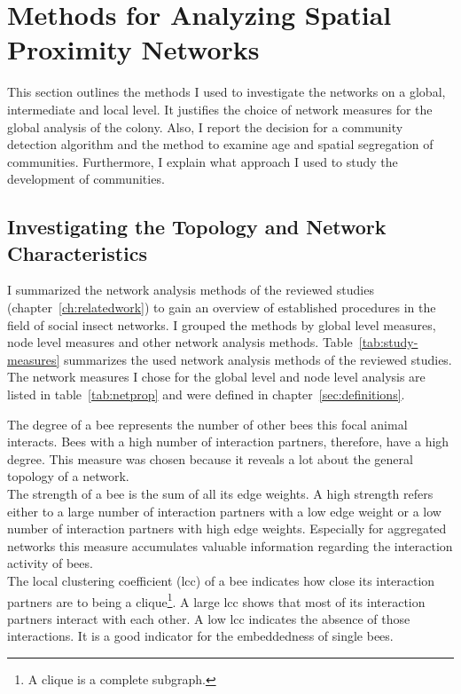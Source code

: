 \section{Methods for Analyzing Spatial Proximity Networks}
This section outlines the methods I used to investigate the networks on a global, intermediate and local level.
It justifies the choice of network measures for the global analysis of the colony.
Also, I report the decision for a community detection algorithm and the method to examine age and spatial segregation of communities.
Furthermore, I explain what approach I used to study the development of communities.

\subsection{Investigating the Topology and Network Characteristics}
\label{subsec:APmeasures}
I summarized the network analysis methods of the reviewed studies (chapter~\ref{ch:relatedwork}) to gain an overview of established procedures in the field of social insect networks. I grouped the methods by global level measures, node level measures and other network analysis methods.
Table~\ref{tab:study-measures} summarizes the used network analysis methods of the reviewed studies.
The network measures I chose for the global level and node level analysis are listed in table~\ref{tab:netprop} and were defined in chapter~\ref{sec:definitions}.

The degree of a bee represents the number of other bees this focal animal interacts.
Bees with a high number of interaction partners, therefore, have a high degree.
This measure was chosen because it reveals a lot about the general topology of a network.\\
The strength of a bee is the sum of all its edge weights. A high strength refers either to a large number of interaction partners with a low edge weight or a low number of interaction partners with high edge weights. Especially for aggregated networks this measure accumulates valuable information regarding the interaction activity of bees.\\
The local clustering coefficient (lcc) of a bee indicates how close its interaction partners are to being a clique\footnote{A clique is a complete subgraph.}. A large lcc shows that most of its interaction partners interact with each other. A low lcc indicates the absence of those interactions.
It is a good indicator for the embeddedness of single bees.\\

